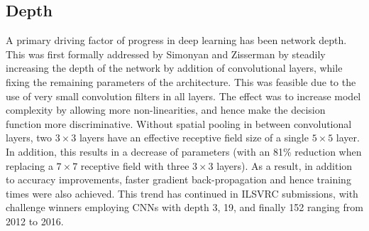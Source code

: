 \documentclass[12pt]{llncs}
\begin{document}
\subsection{Depth}
A primary driving factor of progress in deep learning has been network depth. This was first formally addressed by Simonyan and Zisserman \cite{simonyan2014very} by steadily increasing the depth of the network by addition of convolutional layers, while fixing the remaining parameters of the architecture. This was feasible due to the use of very small convolution filters in all layers. The effect was to increase model complexity by allowing more non-linearities, and hence make the decision function more discriminative. Without spatial pooling in between convolutional layers, two $3 \times 3$ layers have an effective receptive field size of a single $5 \times 5$ layer. In addition, this results in a decrease of parameters (with an 81\% reduction when replacing a $7 \times 7$ receptive field with three $3\times3$ layers). As a result, in addition to accuracy improvements, faster gradient back-propagation and hence training times were also achieved. This trend has continued in ILSVRC submissions, with challenge winners employing CNNs with depth 3, 19, and finally 152 \cite{krizhevsky2012imagenet,simonyan2014very,he2016deep} ranging from 2012 to 2016.


\end{document}

